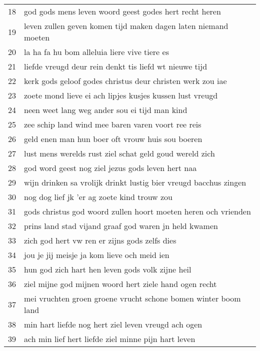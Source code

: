 \begin{longtable}{p{} | p{}}
	18    & god gods mens leven woord geest godes hert recht heren             \\
	19    & leven zullen geven komen tijd maken dagen laten niemand moeten     \\
	20    & la ha fa hu bom alleluia liere vive tiere es                       \\
	21    & liefde vreugd deur rein denkt tis liefd wt nieuwe tijd             \\
	22    & kerk gods geloof godes christus deur christen werk zou iae         \\
	23    & zoete mond lieve ei ach lipjes kusjes kussen lust vreugd           \\
	24    & neen weet lang weg ander sou ei tijd man kind                      \\
	25    & zee schip land wind mee baren varen voort ree reis                 \\
	26    & geld enen man hun boer oft vrouw huis sou boeren                   \\
	27    & lust mens werelds rust ziel schat geld goud wereld zich            \\
	28    & god word geest nog ziel jezus gods leven hert naa                  \\
	29    & wijn drinken sa vrolijk drinkt lustig bier vreugd bacchus zingen   \\
	30    & nog dog lief jk 'er ag zoete kind trouw zou                        \\
	31    & gods christus god woord zullen hoort moeten heren och vrienden     \\
	32    & prins land stad vijand graaf god waren jn held kwamen              \\
	33    & zich god hert vw ren er zijns gods zelfs dies                      \\
	34    & jou je jij meisje ja kom lieve och meid ien                        \\
	35    & hun god zich hart hen leven gods volk zijne heil                   \\
	36    & ziel mijne god mijnen woord hert ziele hand ogen recht             \\
	37    & mei vruchten groen groene vrucht schone bomen winter boom land     \\
	38    & min hart liefde nog hert ziel leven vreugd ach ogen                \\
	39    & ach min lief hert liefde ziel minne pijn hart leven                \\

\end{longtable}

